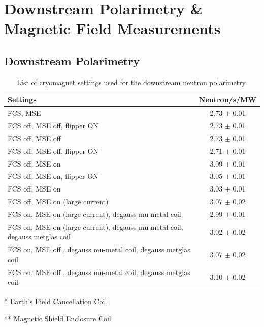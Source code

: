 \chapter{Downstream Polarimetry \& Magnetic Field Measurements}
\label{app:down_poldata}

\section{Downstream Polarimetry}

\begin{table}[h]
\centering
\begin{threeparttable}
\caption{List of cryomagnet settings used for the downstream neutron polarimetry.}
\label{tab:down_poldata}
\begin{tabular}{@{}lc@{}}
\toprule
Settings & Neutron/s/MW \\ \midrule
FCS\tnote{*}, MSE\tnote{**} & 2.73 $\pm$ 0.01 \\
FCS off, MSE off, flipper ON & 2.73 $\pm$ 0.01 \\
FCS off, MSE off & 2.73 $\pm$ 0.01 \\
FCS off, MSE off, flipper ON & 2.71 $\pm$ 0.01 \\
FCS off, MSE on & 3.09 $\pm$ 0.01 \\
FCS off, MSE on, flipper ON & 3.05 $\pm$ 0.01 \\
FCS off, MSE on & 3.03 $\pm$ 0.01 \\
FCS off, MSE on (large current) & 3.07 $\pm$ 0.02 \\
FCS on, MSE on (large current), degauss mu-metal coil & 2.99 $\pm$ 0.01 \\
FCS on, MSE on (large current), degauss mu-metal coil, degauss metglas coil & 3.02 $\pm$ 0.02 \\
FCS on, MSE off , degauss mu-metal coil, degauss metglas coil & 3.07 $\pm$ 0.02 \\
FCS on, MSE off , degauss mu-metal coil, degauss metglas coil & 3.10 $\pm$ 0.02 \\ \bottomrule
\end{tabular}

    \begin{tablenotes}
      \item[*] Earth’s Field Cancellation Coil
      \item[**] Magnetic Shield Enclosure Coil
    \end{tablenotes}

  \end{threeparttable}
\end{table}

